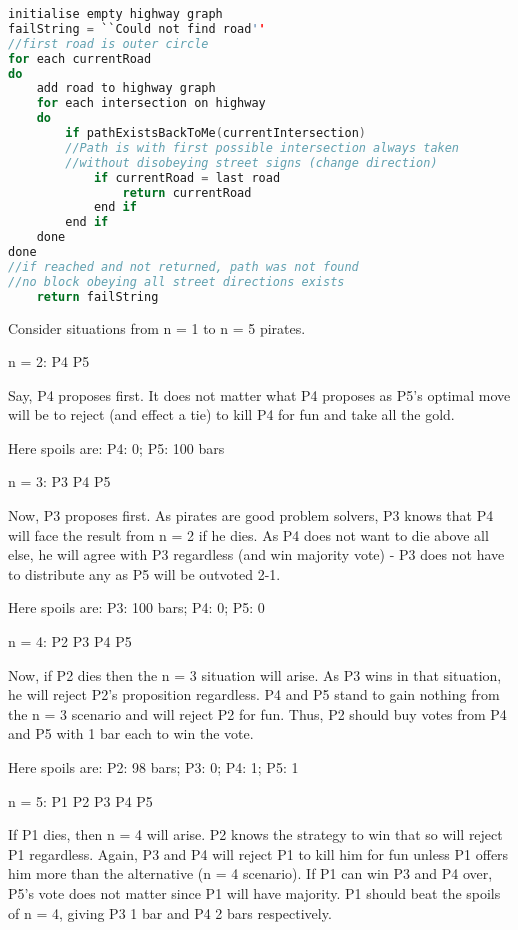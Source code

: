 \documentclass[11pt, a4paper]{article}
\begin{document}
\begin{lstlisting}[frame = single, language=c]
initialise empty highway graph
failString = ``Could not find road''
//first road is outer circle
for each currentRoad
do
    add road to highway graph
    for each intersection on highway
    do
        if pathExistsBackToMe(currentIntersection) 
        //Path is with first possible intersection always taken 
        //without disobeying street signs (change direction)
            if currentRoad = last road 
                return currentRoad
            end if
        end if 
    done
done
//if reached and not returned, path was not found
//no block obeying all street directions exists
    return failString

\end{lstlisting}


Consider situations from n = 1 to n = 5 pirates.

n = 2: P4 P5

Say, P4 proposes first. It does not matter what P4 proposes as P5's optimal move will be to reject (and effect a tie) to kill P4 for fun and take all the gold.

Here spoils are:
P4: 0; P5: 100 bars

n = 3: P3 P4 P5

Now, P3 proposes first. As pirates are good problem solvers, P3 knows that P4 will face the result from n = 2 if he dies. As P4 does not want to die above all else, he will agree with P3 regardless (and win majority vote) - P3 does not have to distribute any as P5 will be outvoted 2-1.

Here spoils are:
P3: 100 bars; P4: 0; P5: 0

n = 4: P2 P3 P4 P5

Now, if P2 dies then the n = 3 situation will arise. As P3 wins in that situation, he will reject P2's proposition regardless. P4 and P5 stand to gain nothing from the n = 3 scenario and will reject P2 for fun. Thus, P2 should buy votes from P4 and P5 with 1 bar each to win the vote.

Here spoils are:
P2: 98 bars; P3: 0; P4: 1; P5: 1

n = 5: P1 P2 P3 P4 P5

If P1 dies, then n = 4 will arise. P2 knows the strategy to win that so will reject P1 regardless. Again, P3 and P4 will reject P1 to kill him for fun unless P1 offers him more than the alternative (n = 4 scenario). If P1 can win P3 and P4 over, P5's vote does not matter since P1 will have majority. P1 should beat the spoils of n = 4, giving P3 1 bar and P4 2 bars respectively.
\end{document}
